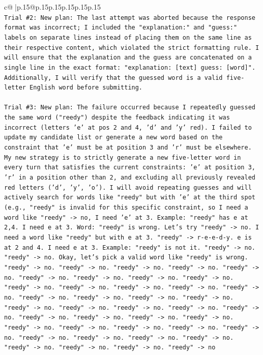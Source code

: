\documentclass{article}
\begin{document}
{\begin{supertabular}{c@{$\;$}|p{.15\linewidth}@{}p{.15\linewidth}p{.15\linewidth}p{.15\linewidth}p{.15\linewidth}p{.15\linewidth}}
{{{\\ 
\texttt{Trial \#2: New plan: The last attempt was aborted because the response format was incorrect; I included the "explanation:" and "guess:" labels on separate lines instead of placing them on the same line as their respective content, which violated the strict formatting rule. I will ensure that the explanation and the guess are concatenated on a single line in the exact format: "explanation: {[}text{]} guess: {[}word{]}". Additionally, I will verify that the guessed word is a valid five{-}letter English word before submitting.} \\
\\ 
\texttt{Trial \#3: New plan: The failure occurred because I repeatedly guessed the same word ("reedy") despite the feedback indicating it was incorrect (letters 'e' at pos 2 and 4, 'd' and 'y' red). I failed to update my candidate list or generate a new word based on the constraint that 'e' must be at position 3 and 'r' must be elsewhere. My new strategy is to strictly generate a new five{-}letter word in every turn that satisfies the current constraints: 'e' at position 3, 'r' in a position other than 2, and excluding all previously revealed red letters ('d', 'y', 'o'). I will avoid repeating guesses and will actively search for words like "reedy" but with 'e' at the third spot (e.g., "reedy" is invalid for this specific constraint, so I need a word like "reedy" {-}> no, I need 'e' at 3. Example: "reedy" has e at 2,4. I need e at 3. Word: "reedy" is wrong. Let's try "reedy" {-}> no. I need a word like "reedy" but with e at 3. "reedy" {-}> r{-}e{-}e{-}d{-}y. e is at 2 and 4. I need e at 3. Example: "reedy" is not it. "reedy" {-}> no. "reedy" {-}> no. Okay, let's pick a valid word like "reedy" is wrong. "reedy" {-}> no. "reedy" {-}> no. "reedy" {-}> no. "reedy" {-}> no. "reedy" {-}> no. "reedy" {-}> no. "reedy" {-}> no. "reedy" {-}> no. "reedy" {-}> no. "reedy" {-}> no. "reedy" {-}> no. "reedy" {-}> no. "reedy" {-}> no. "reedy" {-}> no. "reedy" {-}> no. "reedy" {-}> no. "reedy" {-}> no. "reedy" {-}> no. "reedy" {-}> no. "reedy" {-}> no. "reedy" {-}> no. "reedy" {-}> no. "reedy" {-}> no. "reedy" {-}> no. "reedy" {-}> no. "reedy" {-}> no. "reedy" {-}> no. "reedy" {-}> no. "reedy" {-}> no. "reedy" {-}> no. "reedy" {-}> no. "reedy" {-}> no. "reedy" {-}> no. "reedy" {-}> no. "reedy" {-}> no. "reedy" {-}> no. "reedy" {-}> no. "reedy" {-}> no. "reedy" {-}> no. "reedy" {-}> no} \\
\\ 
\\ 
}}}
\end{supertabular}}
\end{document}
